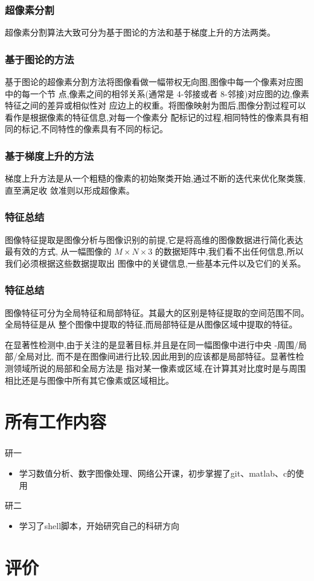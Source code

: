 \documentclass[notheorems,mathserif,table,compress]{beamer}  %
\begin{document}
\begin{frame}
\frametitle{超像素分割}
超像素分割算法大致可分为基于图论的方法和基于梯度上升的方法两类。
\end{frame}


\begin{frame}
  \frametitle{基于图论的方法}
  基于图论的超像素分割方法将图像看做一幅带权无向图,图像中每一个像素对应图中的每一个节 点,像素之间的相邻关系(通常是 4-邻接或者 8-邻接)对应图的边,像素特征之间的差异或相似性对 应边上的权重。将图像映射为图后,图像分割过程可以看作是根据像素的特征信息,对每一个像素分 配标记的过程,相同特性的像素具有相同的标记,不同特性的像素具有不同的标记。
\end{frame}


\begin{frame}
  \frametitle{基于梯度上升的方法}
  梯度上升方法是从一个粗糙的像素的初始聚类开始,通过不断的迭代来优化聚类簇,直至满足收 敛准则以形成超像素。
\end{frame}


\begin{frame}
  \frametitle{特征总结}
  图像特征提取是图像分析与图像识别的前提,它是将高维的图像数据进行简化表达最有效的方式, 从一幅图像的 $M \times N \times 3$ 的数据矩阵中,我们看不出任何信息,所以我们必须根据这些数据提取出 图像中的关键信息,一些基本元件以及它们的关系。
\end{frame}

\begin{frame}
  \frametitle{特征总结}
图像特征可分为全局特征和局部特征。其最大的区别是特征提取的空间范围不同。全局特征是从 整个图像中提取的特征,而局部特征是从图像区域中提取的特征。

在显著性检测中,由于关注的是显著目标,并且是在同一幅图像中进行中央 -周围/局部/全局对比, 而不是在图像间进行比较,因此用到的应该都是局部特征。显著性检测领域所说的局部和全局方法是 指对某一像素或区域,在计算其对比度时是与周围相比还是与图像中所有其它像素或区域相比。
\end{frame}


\section{所有工作内容}

\begin{frame}
  \frametitle{}
  研一
  \begin{itemize}
  \item 学习数值分析、数字图像处理、网络公开课，初步掌握了git、matlab、c的使用
  \end{itemize}
  研二
  \begin{itemize}
  \item 学习了shell脚本，开始研究自己的科研方向
  \end{itemize} 
\end{frame}

\section{评价}

\begin{frame}
  \frametitle{}
  
\end{frame}
\end{document}
